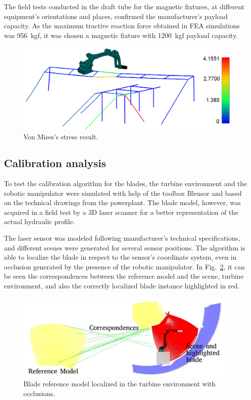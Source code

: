 The field tests conducted in the draft tube for the magnetic fixtures, at
different equipment's orientations and places, confirmed the manufacturer's
payload capacity. As the maximum tractive reaction force obtained in FEA
simulations was 956~kgf, it was chosen a magnetic fixture with 1200~kgf
payload capacity.

\begin{figure}
	\centering
	\includegraphics[width=.95\columnwidth]{figs/mecanica/von_mises.png}
    \caption{Von Mises's stress result.}
    \label{fig:von_mises}
\end{figure}

\subsection{Calibration analysis}

To test the calibration algorithm for the blades, the turbine
environment and the robotic manipulator were simulated with help of the toolbox
Blensor \cite{Gschwandtner11b} and based on the technical drawings from the
powerplant. The blade model, however, was acquired in a field test by a 3D laser
scanner for a better representation of the actual hydraulic profile.

The laser sensor was modeled following manufacturer's technical
specifications, and different scenes were generated for several sensor
positions. The algorithm is able to localize the blade in respect to the
sensor's coordinate system, even in occlusion generated by the presence of the
robotic manipulator. In Fig.~\ref{fig:calibration}, it can be seen the
correspondences between the reference model and the scene, turbine
environment, and also the correctly localized blade instance highlighted in red.

\begin{figure}
	\centering
	\includegraphics[width=.95\columnwidth]{figs/results/sim_mh12_sp}
    \caption{Blade reference model localized in the turbine environment with
    occlusions.}
    \label{fig:calibration}
\end{figure}

